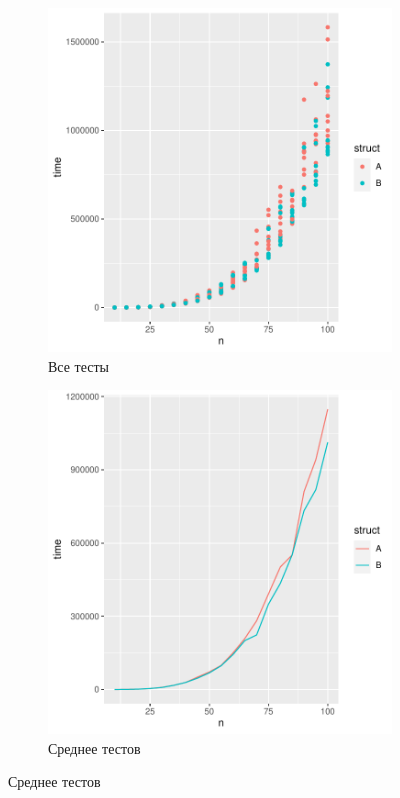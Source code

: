 \documentclass[ucs, notheorems, handout]{beamer}
\begin{document}
\begin{frame}
    \begin{figure}[h]
        \begin{subfigure}[t]{0.475\linewidth}%
            \includegraphics[width=\linewidth]{point.pdf}
            \caption{Все тесты}
        \end{subfigure}%
        \hfill
        \begin{subfigure}[t]{0.475\linewidth}%
            \includegraphics[width=\linewidth]{line.pdf}
            \caption{Среднее тестов}
        \end{subfigure}
    \end{figure}


\end{frame}
\end{document}
